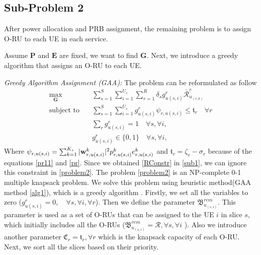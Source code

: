 \documentclass[conference]{IEEEtran}
\begin{document}
\subsection{Sub-Problem 2}\label{sub2}
After power allocation and PRB assignment, the remaining problem is to assign O-RU to each UE in each service.

Assume $\boldsymbol{P}$ and $\boldsymbol{E}$ are fixed, we want to find $\boldsymbol{G}$.
Next, we introduce a greedy algorithm that assigns an O-RU to each UE.

\textit{Greedy Algorithm Assignment (GAA):}
The problem can be reformulated as follow
\begin{subequations}\label{problem2}
\begin{alignat}{4}
\max\limits_{ \boldsymbol{G} }   \quad &  \sum_{s=1}^S\sum_{i=1}^{U_s}\sum_{r=1}^{R} \delta_s g^r_{u(s,i)}\bar{\mathcal{R}}^r_{u_{(s,k)}} \ \\
\text{subject to} \quad  & \sum_{s=1}^{S}\sum_{i=1}^{U_s} g_{u(s,i)}^r \psi_{r,u(s,i)}\leq \mathfrak{t}_r \quad \forall r
 \label{p11} \\
& \sum_{r}g^r_{u(s,i)} = 1  \quad \forall s,\forall i, \label{p12}\\
 & g^r_{u(s,i)} \in \{0,1\} \quad \forall s,\forall i, \label{p13}  
\end{alignat}
\end{subequations}
Where $ \psi_{r,u(s,i)}=\sum_{k=1}^{K_s}|\bold{w}_{r,u(s,i)}^{k}|^2 p_{r,u(s,i)}^{k}  e^k_{r,u(s,i)}$
and $\mathfrak{t}_r = \zeta_r- \sigma_r$  because of the equations \eqref{pr11} and \eqref{pr}.
Since we obtained \eqref{RConstr} in \eqref{sub1}, we can ignore this constraint in \eqref{problem2}.
The problem \eqref{problem2} is an NP-complete 0-1 multiple knapsack problem.  
We solve this problem using heuristic method(GAA method \ref{alg1}), which is a greedy algorithm \cite{akccay2007greedy,lee2018dynamic}.
Firstly, we set all the variables to zero ($g^r_{u(s,i)} = 0, \quad \forall s, \forall i, \forall r$). 
Then we define the parameter ${\mathfrak{B}}^{rem}_{u_{(s,i)}}$. This parameter is used as a set of O-RUs that can be assigned to the UE $i$ in slice $s$, which initially includes all the O-RUs (${\mathfrak{B}}^{rem}_{u_{(s,i)}} = \mathcal{R}, \forall s, \forall i$ ). 
Also we introduce another parameter $ \mathfrak{C}_r = \mathfrak{t}_r, \forall r$
which is the knapsack capacity of each O-RU.
Next, we sort all the slices based on their priority. 
\end{document}
